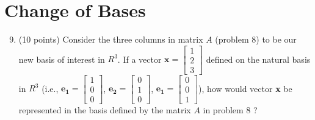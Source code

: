 \documentclass{article}%
\begin{document}
\section*{Change of Bases}
\begin{enumerate}
  \setcounter{enumi}{8}
    \item (10 points) Consider the three columns in matrix $A$ (problem 8) to be our new basis of interest in $R^3$. If a vector $\mathbf{x} = \begin{bmatrix} 1 \\ 2 \\ 3 \end{bmatrix}$ defined on the natural basis in $R^3$ (i.e.,  $\mathbf{e_1} = \begin{bmatrix} 1 \\ 0 \\ 0 \end{bmatrix}$, $\mathbf{e_2} = \begin{bmatrix} 0 \\ 1 \\ 0 \end{bmatrix}$, $\mathbf{e_1} = \begin{bmatrix} 0 \\ 0 \\ 1 \end{bmatrix}$), how would vector \textbf{x} be represented in the basis defined by the matrix $A$ in problem 8 ?\vspace{2ex}
    

\end{enumerate}
\end{document}
